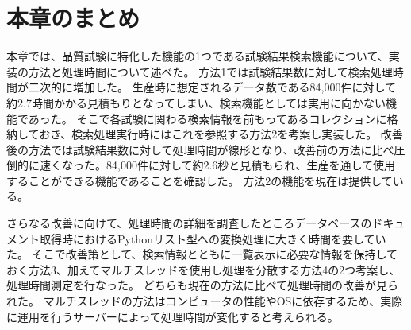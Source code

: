 \section{本章のまとめ}
本章では、品質試験に特化した機能の1つである試験結果検索機能について、実装の方法と処理時間について述べた。
方法1では試験結果数に対して検索処理時間が二次的に増加した。
生産時に想定されるデータ数である84,000件に対して約2.7時間かかる見積もりとなってしまい、検索機能としては実用に向かない機能であった。
そこで各試験に関わる検索情報を前もってあるコレクションに格納しておき、検索処理実行時にはこれを参照する方法2を考案し実装した。
改善後の方法では試験結果数に対して処理時間が線形となり、改善前の方法に比べ圧倒的に速くなった。84,000件に対して約2.6秒と見積もられ、生産を通して使用することができる機能であることを確認した。
方法2の機能を現在は提供している。

さらなる改善に向けて、処理時間の詳細を調査したところデータベースのドキュメント取得時におけるPythonリスト型への変換処理に大きく時間を要していた。
そこで改善策として、検索情報とともに一覧表示に必要な情報を保持しておく方法3、加えてマルチスレッドを使用し処理を分散する方法4の2つ考案し、処理時間測定を行なった。
どちらも現在の方法に比べて処理時間の改善が見られた。
マルチスレッドの方法はコンピュータの性能やOSに依存するため、実際に運用を行うサーバーによって処理時間が変化すると考えられる。

